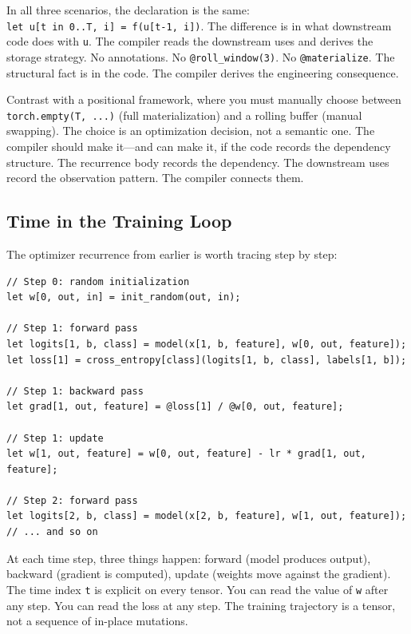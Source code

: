 \documentclass[11pt,titlepage]{article}
\begin{document}
In all three scenarios, the declaration is the same:
\texttt{let\ u{[}t\ in\ 0..T,\ i{]}\ =\ f(u{[}t-1,\ i{]})}. The
difference is in what downstream code does with \texttt{u}. The compiler
reads the downstream uses and derives the storage strategy. No
annotations. No \texttt{@roll\_window(3)}. No \texttt{@materialize}. The
structural fact is in the code. The compiler derives the engineering
consequence.

Contrast with a positional framework, where you must manually choose
between \texttt{torch.empty(T,\ ...)} (full materialization) and a
rolling buffer (manual swapping). The choice is an optimization
decision, not a semantic one. The compiler should make it---and can make
it, if the code records the dependency structure. The recurrence body
records the dependency. The downstream uses record the observation
pattern. The compiler connects them.

\vspace{2em}

\hypertarget{time-in-the-training-loop}{%
\subsection{Time in the Training Loop}\label{time-in-the-training-loop}}

The optimizer recurrence from earlier is worth tracing step by step:

\begin{verbatim}
// Step 0: random initialization
let w[0, out, in] = init_random(out, in);

// Step 1: forward pass
let logits[1, b, class] = model(x[1, b, feature], w[0, out, feature]);
let loss[1] = cross_entropy[class](logits[1, b, class], labels[1, b]);

// Step 1: backward pass
let grad[1, out, feature] = @loss[1] / @w[0, out, feature];

// Step 1: update
let w[1, out, feature] = w[0, out, feature] - lr * grad[1, out, feature];

// Step 2: forward pass
let logits[2, b, class] = model(x[2, b, feature], w[1, out, feature]);
// ... and so on
\end{verbatim}

At each time step, three things happen: forward (model produces output),
backward (gradient is computed), update (weights move against the
gradient). The time index \texttt{t} is explicit on every tensor. You
can read the value of \texttt{w} after any step. You can read the loss
at any step. The training trajectory is a tensor, not a sequence of
in-place mutations.
\end{document}
